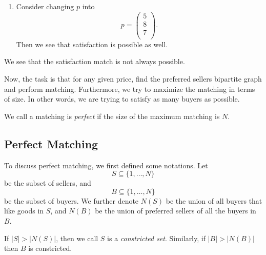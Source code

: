 \begin{eg}
\begin{enumerate}
		\item Consider changing \(p\) into
		      \[
			      p = \begin{pmatrix}
				      5 \\
				      8 \\
				      7 \\
			      \end{pmatrix}.
		      \]
		      Then we see that satisfaction is possible as well.
		      \begin{figure}[H]
			      \centering
			      \label{fig:satisfaction-eg-3}
		      \end{figure}
	\end{enumerate}
\end{eg}

\begin{remark}
	We see that the satisfaction match is not always possible.
\end{remark}

Now, the task is that for any given price, find the preferred sellers bipartite graph and perform matching. Furthermore, we try to
maximize the matching in terms of size. In other words, we are trying to satisfy as many buyers as possible.

\begin{note}
	We call a matching is \emph{perfect} if the size of the maximum matching is \(N\).
\end{note}

\subsection{Perfect Matching}
To discuss perfect matching, we first defined some notations. Let
\[
	S\subseteq \{1, \ldots , N\}
\] be the subset of sellers, and
\[
	B\subseteq\{1, \ldots , N\}
\]
be the subset of buyers. We further denote \(N(S)\) be the union of all buyers that like goods in \(S\), and \(N(B)\) be the union
of preferred sellers of all the buyers in \(B\).

If \(\left\vert S \right\vert > \left\vert N(S) \right\vert \), then we call \(S\) is a \emph{constricted set}. Similarly, if
\(\left\vert B \right\vert > \left\vert N(B) \right\vert \) then \(B\) is constricted.

